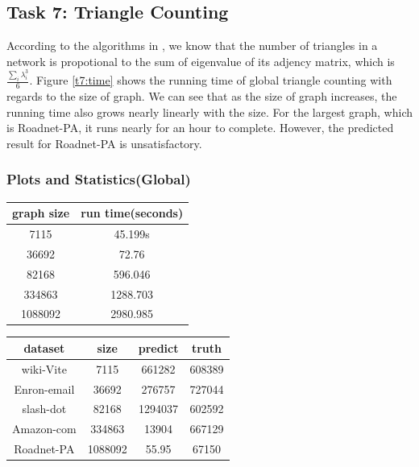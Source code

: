 \subsection{Task 7: Triangle Counting}
According to the algorithms in \cite{}, we know that the number of triangles in a network is propotional to the sum of eigenvalue of its adjency matrix, which is $\frac{\sum_{i}\lambda_{i}^{3}}{6}$. Figure \ref{t7:time} shows the running time of global triangle counting with regards to the size of graph. We can see that as the size of graph increases, the running time also grows nearly linearly with the size. For the largest graph, which is Roadnet-PA, it runs nearly for an hour to complete. However, the predicted result for Roadnet-PA is unsatisfactory. 

\subsubsection{Plots and Statistics(Global)}

\begin{tabular}{ | c | c | }
    \hline
    graph size & run time(seconds) \\ \hline
    7115 & 45.199s \\ \hline
    36692 & 72.76 \\ \hline
    82168 & 596.046 \\ \hline
    334863 & 1288.703 \\ \hline
    1088092 & 2980.985 \\ \hline
\end{tabular}

\begin{tabular} {| c | c | c | c | }
    \hline
    dataset & size & predict & truth \\ \hline
    wiki-Vite & 7115 & 661282 & 608389 \\ \hline
    Enron-email & 36692 & 276757 & 727044 \\ \hline
    slash-dot & 82168 & 1294037 & 602592 \\ \hline
    Amazon-com & 334863 & 13904 & 667129 \\ \hline
    Roadnet-PA & 1088092 & 55.95 & 67150 \\ \hline
\end{tabular}

